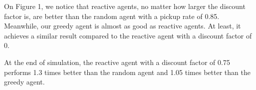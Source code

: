 \documentclass[11pt]{article}
\begin{document}
On Figure 1, we notice that reactive agents, no matter how larger the discount factor is, are better than the random agent with a pickup rate of 0.85. Meanwhile, our greedy agent is almost as good as reactive agents. At least, it achieves a similar result compared to the reactive agent with a discount factor of 0.

At the end of simulation, the reactive agent with a discount factor of 0.75 performs 1.3 times better than the random agent and 1.05 times better than the greedy agent.

\begin{figure}
\centering
{}\hfill
{}\hfill
{}


\end{figure}
\end{document}
